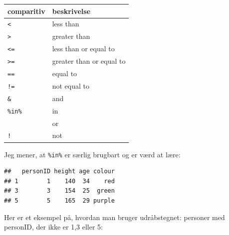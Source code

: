\documentclass[
]{book}
\newenvironment{Shaded}{\begin{snugshade}}{\end{snugshade}}
\newcommand{\CommentTok}[1]{\textcolor[rgb]{0.56,0.35,0.01}{\textit{#1}}}
\newcommand{\DecValTok}[1]{\textcolor[rgb]{0.00,0.00,0.81}{#1}}
\newcommand{\FunctionTok}[1]{\textcolor[rgb]{0.13,0.29,0.53}{\textbf{#1}}}
\newcommand{\NormalTok}[1]{#1}
\newcommand{\SpecialCharTok}[1]{\textcolor[rgb]{0.81,0.36,0.00}{\textbf{#1}}}
\begin{document}
\begin{longtable}[]{@{}ll@{}}
\toprule\noalign{}
comparitiv & beskrivelse \\
\midrule\noalign{}
\endhead
\bottomrule\noalign{}
\endlastfoot
\texttt{\textless{}} & less than \\
\texttt{\textgreater{}} & greater than \\
\texttt{\textless{}=} & less than or equal to \\
\texttt{\textgreater{}=} & greater than or equal to \\
\texttt{==} & equal to \\
\texttt{!=} & not equal to \\
\texttt{\&} & and \\
\texttt{\%in\%} & in \\
\texttt{\textbar{}} & or \\
\texttt{!} & not \\
\end{longtable}

Jeg mener, at \texttt{\%in\%} er særlig brugbart og er værd at lære:

\begin{Shaded}
\end{Shaded}

\begin{verbatim}
##   personID height age colour
## 1        1    140  34    red
## 3        3    154  25  green
## 5        5    165  29 purple
\end{verbatim}

Her er et eksempel på, hvordan man bruger udråbstegnet: personer med personID, der ikke er 1,3 eller 5:

\begin{Shaded}
\end{Shaded}
\end{document}
